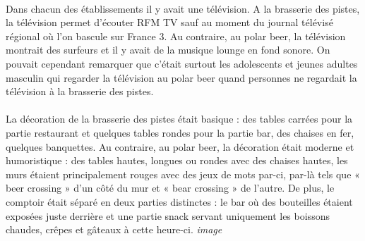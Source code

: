 \paragraph{}
Dans chacun des établissements il y avait une télévision. A la brasserie des pistes, la télévision permet d’écouter RFM TV sauf au moment du journal télévisé régional où l’on bascule sur France 3. Au contraire, au polar beer, la télévision montrait des surfeurs et il y avait de la musique lounge en fond sonore. On pouvait cependant remarquer que c’était surtout les adolescents et jeunes adultes masculin qui regarder la télévision au polar beer quand personnes ne regardait la télévision à la brasserie des pistes.

\paragraph{}
La décoration de la brasserie des pistes était basique : des tables carrées pour la partie restaurant et quelques tables rondes pour la partie bar, des chaises en fer, quelques banquettes. Au contraire, au polar beer, la décoration était moderne et humoristique : des tables hautes, longues ou rondes avec des chaises hautes, les murs étaient principalement rouges avec des jeux de mots par-ci, par-là tels que « beer crossing » d’un côté du mur et « bear crossing » de l’autre. De plus, le comptoir était séparé en deux parties distinctes : le bar où des bouteilles étaient exposées juste derrière et une partie snack servant uniquement les boissons chaudes, crêpes et gâteaux à cette heure-ci. 
\emph{image}
